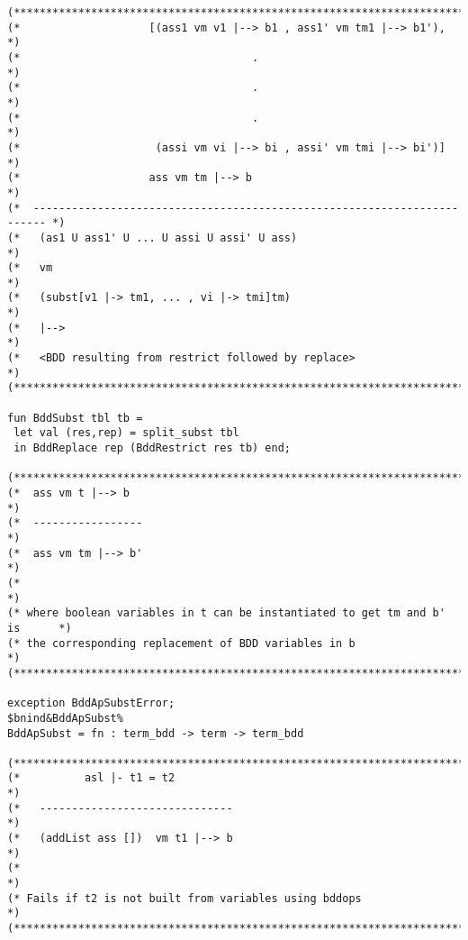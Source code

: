 \documentclass[12pt]{article}
\begin{document}
\begin{footnotesize}
\begin{Verbatim}[commandchars=\$\&\%]
(*****************************************************************************)
(*                    [(ass1 vm v1 |--> b1 , ass1' vm tm1 |--> b1'),         *)
(*                                    .                                      *)
(*                                    .                                      *)
(*                                    .                                      *)
(*                     (assi vm vi |--> bi , assi' vm tmi |--> bi')]         *)
(*                    ass vm tm |--> b                                       *)
(*  ------------------------------------------------------------------------ *)
(*   (as1 U ass1' U ... U assi U assi' U ass)                                *)
(*   vm                                                                      *)
(*   (subst[v1 |-> tm1, ... , vi |-> tmi]tm)                                 *)
(*   |-->                                                                    *)
(*   <BDD resulting from restrict followed by replace>                       *)
(*****************************************************************************)

fun BddSubst tbl tb =
 let val (res,rep) = split_subst tbl
 in BddReplace rep (BddRestrict res tb) end;

(*****************************************************************************)
(*  ass vm t |--> b                                                          *)
(*  -----------------                                                        *)
(*  ass vm tm |--> b'                                                        *)
(*                                                                           *)
(* where boolean variables in t can be instantiated to get tm and b' is      *)
(* the corresponding replacement of BDD variables in b                       *)
(*****************************************************************************)

exception BddApSubstError;
$bnind&BddApSubst%
BddApSubst = fn : term_bdd -> term -> term_bdd

(*****************************************************************************)
(*          asl |- t1 = t2                                                   *)
(*   ------------------------------                                          *)
(*   (addList ass [])  vm t1 |--> b                                          *)
(*                                                                           *)
(* Fails if t2 is not built from variables using bddops                      *)
(*****************************************************************************)


\end{Verbatim}
\end{footnotesize}
\end{document}
